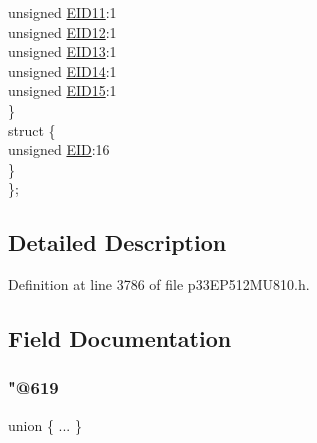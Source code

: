 \begin{DoxyCompactItemize}
\begin{tabbing}
\>\>unsigned \hyperlink{structtag_c1_r_x_f1_e_i_d_b_i_t_s_a710bdb0d602deb021b0be99066008018}{EID11}:1\\
\>\>unsigned \hyperlink{structtag_c1_r_x_f1_e_i_d_b_i_t_s_aa347bb85867bd8d4e0124f7cff8c6472}{EID12}:1\\
\>\>unsigned \hyperlink{structtag_c1_r_x_f1_e_i_d_b_i_t_s_a37d5f3edcbf6ef62f848fd4f3c584f79}{EID13}:1\\
\>\>unsigned \hyperlink{structtag_c1_r_x_f1_e_i_d_b_i_t_s_a7ffc0b0e0d99b8476b6f9a45337c17ab}{EID14}:1\\
\>\>unsigned \hyperlink{structtag_c1_r_x_f1_e_i_d_b_i_t_s_a293cd7dc1746257fa75a60cbd9383cd7}{EID15}:1\\
\>\} \\
\>struct \{\\
\>\>unsigned \hyperlink{structtag_c1_r_x_f1_e_i_d_b_i_t_s_ae80b378c9141f7c03e0b4e55b5f4b54d}{EID}:16\\
\>\} \\
\}; \\

\end{tabbing}\end{DoxyCompactItemize}


\subsection{Detailed Description}


Definition at line 3786 of file p33\+E\+P512\+M\+U810.\+h.



\subsection{Field Documentation}
\mbox{\label{structtag_c1_r_x_f1_e_i_d_b_i_t_s_a8d4ab058212ba43931f13019649f303b}} 
\subsubsection{\texorpdfstring{"@619}{@619}}
{\footnotesize\ttfamily union \{ ... \} }

\mbox{\label{structtag_c1_r_x_f1_e_i_d_b_i_t_s_ae80b378c9141f7c03e0b4e55b5f4b54d}} 
